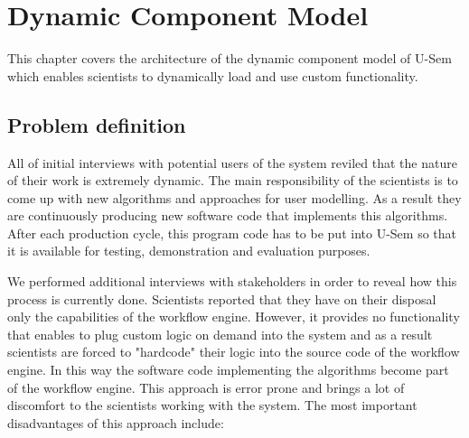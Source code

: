 
\chapter{Dynamic Component Model}

This chapter covers the architecture of the dynamic component model of U-Sem which enables scientists to dynamically load and use custom functionality.


\section{Problem definition}

All of initial interviews with potential users of the system reviled that the nature of their work is extremely dynamic. The main responsibility of the scientists is to come up with new algorithms and approaches for user modelling. As a result they are continuously producing new software code that implements this algorithms. After each production cycle, this program code has to be put into U-Sem so that it is  available for testing, demonstration and evaluation purposes.

We performed additional interviews with stakeholders in order to reveal how this process is currently done. Scientists reported that they have on their disposal only the capabilities of the workflow engine. However, it provides no functionality that enables to plug custom logic on demand into the system and as a result scientists are forced to "hardcode" their logic into the source code of the workflow engine. In this way the software code implementing the algorithms become part of the workflow engine. This approach is error prone and brings a lot of discomfort to the scientists working with the system. The most important disadvantages of this approach include:

